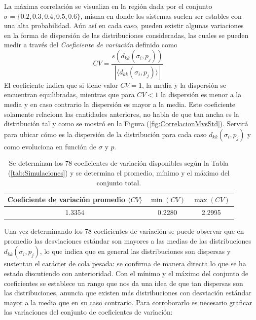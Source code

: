 \documentclass[a4paper,11pt]{book}
\theoremstyle{plain}
\theoremstyle{definition}
\begin{document}
La máxima correlación se visualiza en la región dada por el conjunto $\sigma=\{0.2,0.3,0.4,0.5,0.6\}$, misma en donde los sistemas suelen ser estables con una alta probabilidad. Aún así en cada caso, pueden existir algunas variaciones en la forma de dispersión de las distribuciones consideradas, las cuales se pueden medir a través del \textit{Coeficiente de variación} definido como
\begin{equation}\label{eqn:CV}
	CV=\frac{s(d_{kk}(\sigma_i,p_j))}{|\langle d_{kk}(\sigma_i,p_j)\rangle|}
\end{equation}
El coeficiente indica que si tiene valor $CV=1$, la media y la dispersión se encuentran equilibradas, mientras que para $CV<1$ la dispersión es menor a la media y en caso contrario la dispersión es mayor a la media. Este coeficiente solamente relaciona las cantidades anteriores, no habla de que tan ancha es la distribución tal y como se mostró en la Figura (\ref{fig:CorrelacionMvsStd}). Servirá para ubicar cómo es la dispersión de la distribución para cada caso $d_{kk}(\sigma_i,p_j)$ y como evoluciona en función de $\sigma$ y $p$.
\newpage
\begin{table}[h!]
	\centering
	\begin{tabular}{|c|c|c|}
		\hline
		Coeficiente de variación promedio $\langle CV\rangle$ & $\min(CV)$ & $\max(CV)$ \\ \hline
		1.3354 & 0.2280 & 2.2995\\ \hline
	\end{tabular}
	\caption{Se determinan los 78 coeficientes de variación disponibles según la Tabla (\ref{tab:Simulaciones}) y se determina el promedio, mínimo y el máximo del conjunto total.}
	\label{tab:CVs}
\end{table} 
Una vez determinando los 78 coeficientes de variación se puede observar que en promedio las desviaciones estándar son mayores a las medias de las distribuciones $d_{kk}(\sigma_i,p_j)$, lo que indica que en general las distribuciones son dispersas y sustentan el carácter de cola pesada: se confirma de manera directa lo que se ha estado discutiendo con anterioridad. Con el mínimo y el máximo del conjunto de coeficientes se establece un rango que nos da una idea de que tan dispersas son las distribuciones, anuncia que existen más distribuciones con desviación estándar mayor a la media que en su caso contrario. Para corroborarlo es necesario graficar las variaciones del conjunto de coeficientes de variación:
\end{document}
